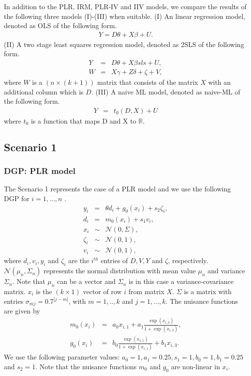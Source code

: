 \documentclass[10pt]{article}
\begin{document}
In addition to the PLR, IRM, PLR-IV and IIV models, we compare the results of the following three models (I)-(III) when suitable.
(I) An linear regression model, denoted as OLS of the following form. 
\begin{eqnarray*}\label{ols}
	Y= D \theta + X \beta + U.
\end{eqnarray*}
(II) A two stage least squares regression model, denoted as 2SLS of the following form. 
\begin{eqnarray*}\label{ols}
	Y &=& D \theta + X \beta sls+ U,\\
	W &=& X \gamma + Z \delta + \zeta + V,
\end{eqnarray*}
where $W$ is a $(n \times (k+1))$ matrix that consists of the matrix $X$ with an additional column which is $D$. 
(III) A naive ML model, denoted as naive-ML of the following form. 
\begin{eqnarray*}\label{ols}
	Y &=& t_0(D, X) + U
\end{eqnarray*}
where $t_0$ is a function that maps D and X to $\mathbb{R}$.



\subsection{Scenario 1}
\subsubsection{DGP: PLR model}
The Scenario 1 represents the case of a PLR model and we use the following DGP for $i=1,...,n$ \cite{Cher2018}.
\begin{eqnarray*}\label{dgp_1.1}
y_i &=& \theta d_i + g_0(x_i) + s_2 \zeta_i, \\
d_i &=& m_0(x_i) + s_1 v_i, \\
x_i &\sim& \mathcal{N}(0, \Sigma),\\
\zeta_i &\sim& \mathcal{N}(0,1),\\
v_i &\sim& \mathcal{N}(0,1),
\end{eqnarray*}
where $d_i, v_i, y_i$ and $\zeta_i$ are the $i^{th}$ entries of $D,V,Y$ and $\zeta$, respectively.
$ \mathcal{N}(\mu_n, \Sigma_n)$ represents the normal distribution with mean value $\mu_n$ and variance $\Sigma_n$.
Note that  $\mu_n$ can be a vector and $\Sigma_n$ is in this case a variance-covariance matrix.
$x_i$ is the $(k \times 1)$ vector of row $i$ from matrix $X$.
$\Sigma$ is a matrix with entries $\sigma_{mj} = 0.7^{|j-m|}$, with $m=1,..,k$ and $j=1,...,k$.
The nuisance functions are given by
\begin{eqnarray*}\label{dgp_1.2}
m_0(x_i) &=& a_0 x_{i,1} + a_1 \frac{\exp(x_{i,3})}{1+\exp(x_{i,3})},\\
g_0(x_i) &=& b_0 \frac{\exp(x_{i,1})}{1+\exp(x_{i,1})} + b_1 x_{i,3}.
\end{eqnarray*}
We use the following parameter values: $a_0=1, a_1=0.25, s_1=1, b_0=1, b_1=0.25$ and $s_2=1$.
Note that the nuisance functions $m_0$ and $g_0$ are non-linear in $x_i$.
\end{document}
